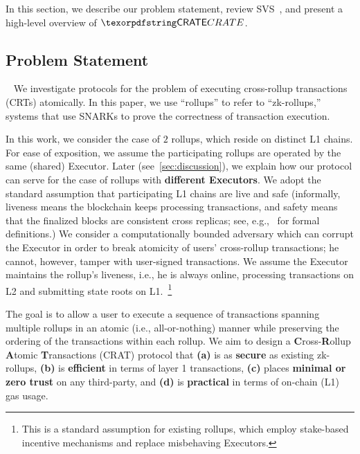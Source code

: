 




In this section, we describe our problem statement, review SVS~\cite{shared-val-seq-23}, and present a high-level overview of $\pname$.

\subsection{Problem Statement}~\label{sec:problem-statement}
We investigate protocols for the problem of executing cross-rollup transactions (CRTs) atomically. 
In this paper, we use ``rollups'' to refer to ``zk-rollups,'' systems that use SNARKs to prove the correctness of transaction execution.


 In this work, we consider the case of $2$ rollups, which reside on distinct L1 chains. For ease of exposition, we assume the participating rollups are operated by the same (shared) Executor. Later (see~\cref{sec:discussion}), we explain how our protocol can serve for the case of rollups with \textbf{different Executors}. 
  We adopt the standard assumption that participating L1 chains are live and safe (informally, liveness means the blockchain keeps processing transactions, and safety means that the finalized blocks are consistent cross replicas; see, e.g.,~\cite{shiFoundations2020} for formal definitions.)
 We consider a computationally bounded adversary which can corrupt the Executor in order to break atomicity of users' cross-rollup transactions; he cannot, however, tamper with user-signed transactions. We assume the Executor maintains the rollup's liveness, i.e., he is always online, processing transactions on L2 and submitting state roots on L1.~\footnote{This is a standard assumption for existing rollups, which employ stake-based incentive mechanisms and replace misbehaving Executors.} 

 The goal is to allow a user to execute a sequence of transactions spanning multiple rollups in an atomic (i.e., all-or-nothing) manner while preserving the ordering of the transactions within each rollup.
 We aim to design a \textbf{C}ross-\textbf{R}ollup \textbf{A}tomic \textbf{T}ransactions (CRAT) protocol that \textbf{(a)} is as \textbf{secure} as existing zk-rollups, \textbf{(b)} is \textbf{efficient} in terms of layer 1 transactions, \textbf{(c)} places \textbf{minimal or zero trust} on any third-party, and \textbf{(d)} is \textbf{practical} in terms of on-chain (L1) gas usage.



